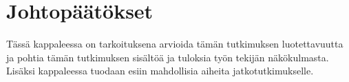 \documentclass[finnish,12pt,a4paper,pdftex]{article}
\begin{document}



\clearpage

\section{Johtopäätökset}

Tässä kappaleessa on tarkoituksena arvioida tämän tutkimuksen luotettavuutta ja pohtia tämän tutkimuksen sisältöä ja tuloksia työn tekijän näkökulmasta. Lisäksi kappaleessa tuodaan esiin mahdollisia aiheita jatkotutkimukselle. 
\end{document}
